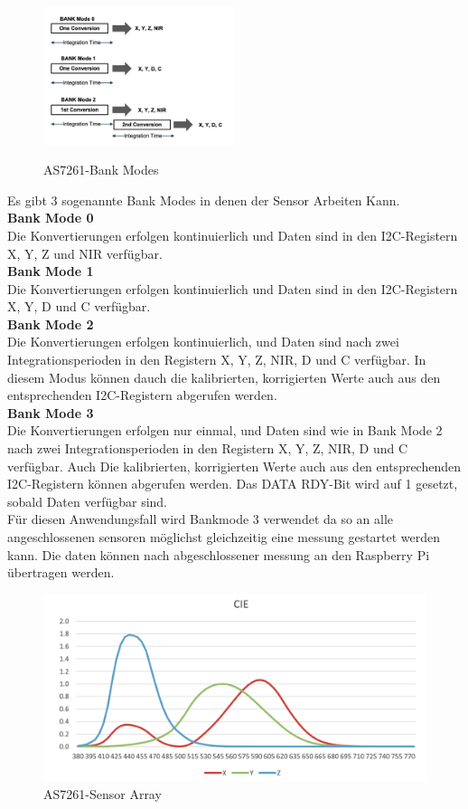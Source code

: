 \begin{figure}
\centering
\caption{AS7261-Bank Modes}
\includegraphics[width=0.5\textwidth]{img/AS7261-Bank_Modes.png}
\label{fig:AS7261-Bank_Modes}
\end{figure}

\noindent Es gibt 3 sogenannte Bank Modes in denen der Sensor Arbeiten Kann.\\
\textbf{Bank Mode 0}\\
Die Konvertierungen erfolgen kontinuierlich und Daten sind in den I2C-Registern X, Y, Z und NIR verfügbar.\\
\textbf{Bank Mode 1}\\
Die Konvertierungen erfolgen kontinuierlich und Daten sind in den I2C-Registern X, Y, D und C verfügbar.\\
\textbf{Bank Mode 2}\\
Die Konvertierungen erfolgen kontinuierlich, und Daten sind nach zwei Integrationsperioden in den Registern X, Y, Z, NIR, D und C verfügbar. 
In diesem Modus können dauch die kalibrierten, korrigierten Werte auch aus den entsprechenden I2C-Registern abgerufen werden.\\
\textbf{Bank Mode 3}\\
Die Konvertierungen erfolgen nur einmal, und Daten sind wie in Bank Mode 2 nach zwei Integrationsperioden in den Registern X, Y, Z, NIR, D und C verfügbar.
Auch Die kalibrierten, korrigierten Werte auch aus den entsprechenden I2C-Registern können abgerufen werden.
Das DATA RDY-Bit wird auf 1 gesetzt, sobald Daten verfügbar sind.\\
Für diesen Anwendungsfall wird Bankmode 3 verwendet da so an alle angeschlossenen sensoren möglichst gleichzeitig eine messung gestartet werden kann.
Die daten können nach abgeschlossener messung an den Raspberry Pi übertragen werden.


  

\begin{figure}[H]
  \centering
 \includegraphics[width=0.6\linewidth]{img/AS7261-Spectral_Responsivity.png}
  \caption{AS7261-Sensor Array}
  \label{fig:AS7261-Sensor_Array}
\end{figure}

